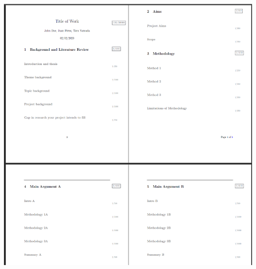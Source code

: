 \documentclass[unknownkeysallowed,usepdftitle=false, parskip=full]{beamer}
\begin{document}
\begin{frame}
{\begin{columns}[t]
\begin{column}[c]{0.45\textwidth}
{      \vspace{12pt}
      
    \includegraphics[scale=0.35]{figure/subsectioning}
      }
    \end{column}
    
  \end{columns}


}


   
\end{frame}
\end{document}
